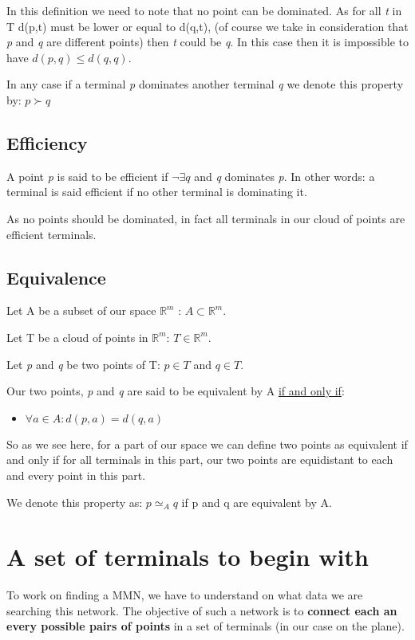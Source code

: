 In this definition we need to note that no point can be dominated. As for all \emph{t} in T d(p,t) must be lower or equal to d(q,t), (of course we take in consideration that \emph{p} and \emph{q} are different points) then \emph{t} could be \emph{q}. In this case then it is impossible to have $d(p,q)\leq d(q,q)$.

In any case if a terminal \emph{p} dominates another terminal \emph{q} we denote this property by: $ p \succ q $
\subsection{Efficiency}%
A point \emph{p} is said to be efficient if $\neg\exists q$ and \emph{q} dominates \emph{p}. In other words: a terminal is said efficient if no other terminal is dominating it.

As no points should be dominated, in fact all terminals in our cloud of points are efficient terminals.
\subsection{Equivalence} %
Let A be a subset of  our space $\mathbb{R}^m$ : $A \subset \mathbb{R}^m$.

Let T be a cloud of points in $\mathbb{R}^m$: $T \in \mathbb{R}^m$.

Let \emph{p} and \emph{q} be two points of T: $p \in T$ and $q \in T$.

\noindent Our two points, \emph{p} and \emph{q} are said to be equivalent by A \underline{if and only if}:
\begin{itemize}[noitemsep, nolistsep]
	\item{$\forall a \in A : d(p,a) = d(q,a)$}
\end{itemize} 

So as we see here, for a part of our space we can define two points as equivalent if and only if for all terminals in this part, our two points are equidistant to each and every point in this part.

We denote this property as: $p \simeq_{A} q$ if p and q are equivalent by A.

\section{A set of terminals to begin with}%
To work on finding a MMN, we have to understand on what data we are searching this network. The objective of such a network is to \textbf{connect each an every possible pairs of points} in a set of terminals (in our case on the plane).

